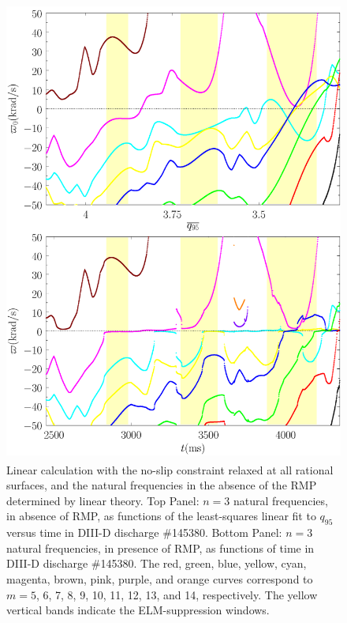 \documentclass[12pt,prb,aps]{revtex4-1}
\begin{document}
\begin{figure}
\includegraphics[height=6in]{fig7.pdf}
\caption{Linear calculation with the no-slip constraint relaxed at all rational surfaces, and  the natural frequencies
in the absence of the RMP determined by linear theory. 
 Top Panel: $n=3$ natural frequencies, in absence of RMP, as functions of the least-squares linear fit to $q_{95}$ versus time
in   DIII-D discharge \#145380.
Bottom Panel:  $n=3$ natural frequencies, in presence of RMP, as functions of time
in   DIII-D discharge \#145380. The red, green, blue, yellow, cyan, magenta, brown, pink,
purple, and orange  curves correspond to $m=5$, 6, 7, 8, 9, 10, 11, 12, 13, and 14, respectively. The yellow vertical bands indicate the ELM-suppression windows.} \label{fig7}
\end{figure}
\end{document}
